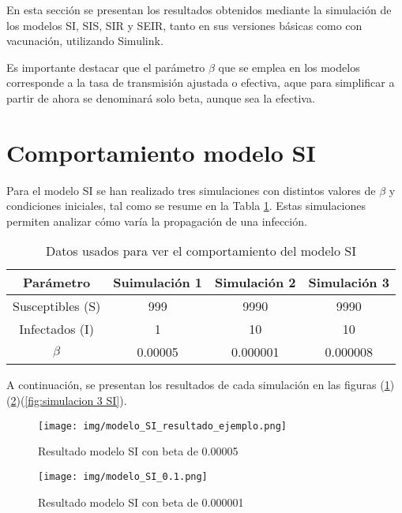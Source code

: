 En esta sección se presentan los resultados obtenidos mediante la simulación de los modelos SI, SIS, SIR y SEIR, tanto en sus versiones básicas como con vacunación, utilizando Simulink. 

Es importante destacar que el parámetro $\beta$ que se emplea en los modelos corresponde a la tasa de transmisión ajustada o efectiva, aque para simplificar a partir de ahora se denominará solo beta, aunque sea la efectiva.

\section{Comportamiento modelo SI}
Para el modelo SI se han realizado tres simulaciones con distintos valores de $\beta$ y condiciones iniciales, tal como se resume en la Tabla \ref{tab:resultadosSI}. Estas simulaciones permiten analizar cómo varía la propagación de una infección.
\begin{table}[H]
\centering
\begin{tabular}{|c|c|c|c|}
\hline
\textbf{Parámetro} & \textbf{Suimulación 1} & \textbf{Simulación 2} & \textbf{Simulación 3} \\
\hline
Susceptibles (S) & 999 & 9990 & 9990 \\
\hline
Infectados (I)  & 1 & 10   & 10   \\
\hline
\(\beta\)   & 0.00005     & 0.000001 & 0.000008 \\
\hline
\end{tabular}
\caption{Datos usados para ver el comportamiento del modelo SI}
\label{tab:resultadosSI}
\end{table}
A continuación, se presentan los resultados de cada simulación en las figuras (\ref{fig:simulación 1 SI})(\ref{fig:simulacion 2 SI})(\ref{fig:simulacion 3 SI}). 
\begin{figure}[H]
    \centering
    \texttt{[image: img/modelo\_SI\_resultado\_ejemplo.png]}
    \caption{Resultado modelo SI con beta de 0.00005}
    \label{fig:simulación 1 SI}
    \vspace{0.5cm} %
\end{figure}

\begin{figure}[H]
    \centering
    \texttt{[image: img/modelo\_SI\_0.1.png]}
    \caption{Resultado modelo SI con beta de 0.000001}
    \label{fig:simulacion 2 SI}
    \vspace{0.5cm} %
\end{figure}

